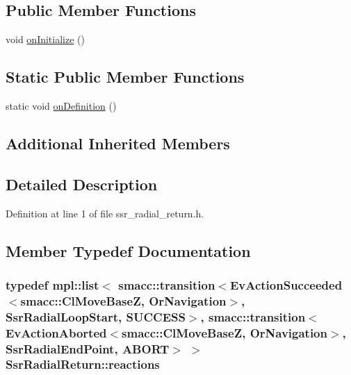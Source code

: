 \subsection*{Public Member Functions}
\begin{DoxyCompactItemize}
\item 
void \hyperlink{structSsrRadialReturn_a713e3a0722102ad2c4b030aeceefe823}{on\+Initialize} ()
\end{DoxyCompactItemize}
\subsection*{Static Public Member Functions}
\begin{DoxyCompactItemize}
\item 
static void \hyperlink{structSsrRadialReturn_a3baaac05dff1106adbacbf57edf0f162}{on\+Definition} ()
\end{DoxyCompactItemize}
\subsection*{Additional Inherited Members}


\subsection{Detailed Description}


Definition at line 1 of file ssr\+\_\+radial\+\_\+return.\+h.



\subsection{Member Typedef Documentation}
\subsubsection[{\texorpdfstring{reactions}{reactions}}]{\setlength{\rightskip}{0pt plus 5cm}typedef mpl\+::list$<$ {\bf smacc\+::transition}$<$Ev\+Action\+Succeeded$<${\bf smacc\+::\+Cl\+Move\+BaseZ}, {\bf Or\+Navigation}$>$, {\bf Ssr\+Radial\+Loop\+Start}, {\bf S\+U\+C\+C\+E\+SS}$>$, {\bf smacc\+::transition}$<$Ev\+Action\+Aborted$<${\bf smacc\+::\+Cl\+Move\+BaseZ}, {\bf Or\+Navigation}$>$, {\bf Ssr\+Radial\+End\+Point}, {\bf A\+B\+O\+RT}$>$ $>$ {\bf Ssr\+Radial\+Return\+::reactions}}\hypertarget{structSsrRadialReturn_aab8eb4d92c8078db56b4fa533dd9b348}{}\label{structSsrRadialReturn_aab8eb4d92c8078db56b4fa533dd9b348}



